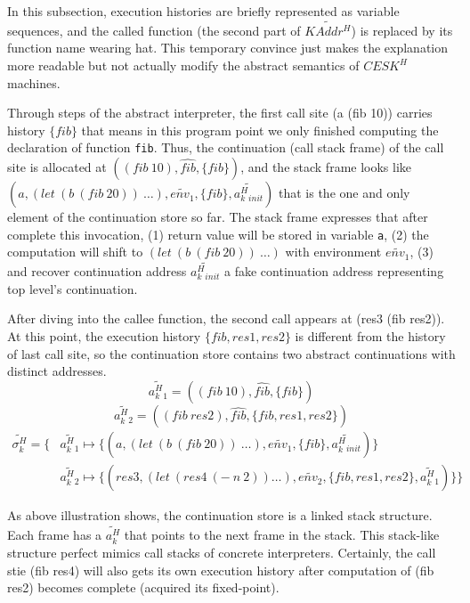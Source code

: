 \documentclass{article}
\begin{document}
In this subsection, execution histories are briefly represented as variable sequences, and the called function (the second part of $\widetilde{KAddr^H}$) is replaced by its function name wearing hat. This temporary convince just makes the explanation more readable but not actually modify the abstract semantics of $CESK^H$ machines.

Through steps of the abstract interpreter, the first call site (a (fib 10)) carries history $\{fib\}$ that means in this program point we only finished computing the declaration of function \verb|fib|.
Thus, the continuation (call stack frame) of the call site is allocated at $((fib\ 10), \widehat{fib}, \{fib\})$, and the stack frame looks like $(a, (let\ (b\ (fib\ 20))\ \dots), \widetilde{env_1}, \{fib\}, \widetilde{a^H_k{}_{init}})$ that is the one and only element of the continuation store so far.
The stack frame expresses that after complete this invocation,
(1) return value will be stored in variable \verb|a|,
(2) the computation will shift to $(let\ (b\ (fib\ 20))\ \dots)$ with environment $\widetilde{env_1}$,
(3) and recover continuation address $\widetilde{a^H_k{}_{init}}$ a fake continuation address representing top level's continuation.

After diving into the callee function, the second call appears at (res3 (fib res2)). At this point, the execution history $\{fib, res1, res2\}$ is different from the history of last call site, so the continuation store contains two abstract continuations with distinct addresses.
\[
\widetilde{a^H_k{}_1} = ((fib\ 10), \widehat{fib}, \{fib\})
\]
\[
\widetilde{a^H_k{}_2} = ((fib\ res2), \widehat{fib}, \{fib, res1, res2\})
\]
\[
\begin{aligned}
\label{eq:show-stack}
\widetilde{\sigma_k^H} = \{ {}& \widetilde{a^H_k{}_1} \mapsto \{(a, (let\ (b\ (fib\ 20))\ \dots), \widetilde{env_1}, \{fib\}, \widetilde{a^H_k{}_{init}})\}  {} \\
                              & \widetilde{a^H_k{}_2} \mapsto \{(res3, (let\ (res4\ (-\ n\ 2)) \dots), \widetilde{env_2}, \{fib, res1, res2\}, \widetilde{a^H_k{}_1})\} \}
\end{aligned}
\]

As above illustration shows, the continuation store is a linked stack structure. Each frame has a $\widetilde{a^H_k}$ that points to the next frame in the stack. This stack-like structure perfect mimics call stacks of concrete interpreters. Certainly, the call stie (fib res4) will also gets its own execution history after computation of (fib res2) becomes complete (acquired its fixed-point).
\end{document}
